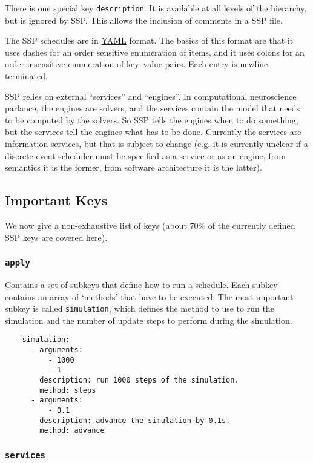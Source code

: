 \documentclass[12pt]{article}
\begin{document}
There is one special key {\tt description}. It is available at all levels of the hierarchy, but is ignored by SSP. This allows the inclusion of comments in a SSP file.

The SSP schedules are in \href{http://fdik.org/yml/}{YAML} format. The basics of this format are that it uses dashes for an order sensitive enumeration of items, and it uses colons for an order insensitive enumeration of key--value pairs. Each entry is newline terminated.

SSP relies on external ``services'' and ``engines''. In computational neuroscience parlance, the engines are solvers, and the services contain the model that needs to be computed by the solvers. So SSP tells the engines when to do something, but the services tell the engines what has to be done. Currently the services are information services, but that is subject to change (e.g. it is currently unclear if a discrete event scheduler must be specified as a service or as an engine, from semantics it is the former, from software architecture it is the latter).

\subsection*{Important Keys}

We now give a non-exhaustive list of keys (about 70\% of the currently defined SSP keys are covered here).

\subsubsection*{\tt apply}

Contains a set of subkeys that define how to run a schedule. Each subkey contains an array of `methods' that have to be executed. The most important subkey is called {\tt simulation}, which defines the method to use to run the simulation and the number of update steps to perform during the simulation. 
\begin{verbatim}
    simulation:
      - arguments:
          - 1000
          - 1
        description: run 1000 steps of the simulation.
        method: steps
      - arguments:
          - 0.1
        description: advance the simulation by 0.1s.
        method: advance
\end{verbatim}

\subsubsection*{\tt services}
\end{document}
